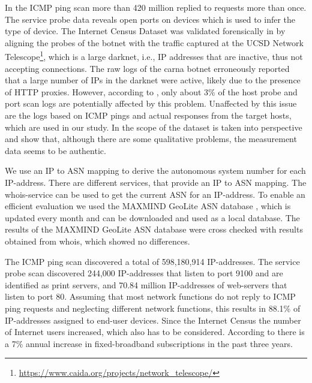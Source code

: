 In the ICMP ping scan more than 420 million replied to requests more than once.
The service probe data reveals open ports on devices which is used to infer the type of device.
The Internet Census Dataset was validated forensically in \cite{dainotticaida} by aligning the probes of the botnet with the traffic captured at the UCSD Network Telescope\footnote{\url{https://www.caida.org/projects/network_telescope/}}, which is a large darknet, i.e., IP addresses that are inactive, thus not accepting connections.
The raw logs of the carna botnet erroneously reported that a large number of IPs in the darknet were active, likely due to the presence of HTTP proxies.
However, according to \cite{dainotticaida}, only about 3\% of the host probe and port scan logs are potentially affected by this problem.
Unaffected by this issue are the logs based on ICMP pings and actual responses from the target hosts, which are used in our study.
In \cite{krenc2014internet} the scope of the dataset is taken into perspective and show that, although there are some qualitative problems, the measurement data seems to be authentic.

We use an IP to ASN mapping to derive the autonomous system number for each IP-address. There are different services, that provide an IP to ASN mapping.
The whois-service can be used to get the current ASN for an IP-address.
To enable an efficient evaluation we used the MAXMIND GeoLite ASN database \cite{geo_ip}, which is updated every month and can be downloaded and used as a local database.
The results of the MAXMIND GeoLite ASN database were cross checked with results obtained from whois, which showed no differences.

The ICMP ping scan discovered a total of 598,180,914 IP-addresses.
The service probe scan discovered 244,000 IP-addresses that listen to port 9100 and are identified as print servers, and 70.84 million IP-addresses of web-servers that listen to port 80.
Assuming that most network functions do not reply to ICMP ping requests and neglecting different network functions, this results in 88.1\% of IP-addresses assigned to end-user devices.
Since the Internet Census the number of Internet users increased, which also has to be considered.
According to \cite{itu2015facts} there is a 7\% annual increase in fixed-broadband subscriptions in the past three years.


